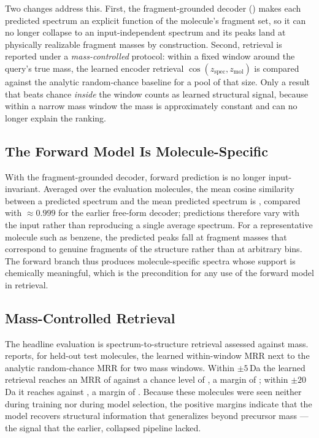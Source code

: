 Two changes address this.
First, the fragment-grounded decoder () makes each predicted spectrum an explicit function of the molecule's fragment set, so it can no longer collapse to an input-independent spectrum and its peaks land at physically realizable fragment masses by construction.
Second, retrieval is reported under a \emph{mass-controlled} protocol: within a fixed window around the query's true mass, the learned encoder retrieval $\cos(z_{\mathrm{spec}}, z_{\mathrm{mol}})$ is compared against the analytic random-chance baseline for a pool of that size.
Only a result that beats chance \emph{inside} the window counts as learned structural signal, because within a narrow mass window the mass is approximately constant and can no longer explain the ranking.

\subsection{The Forward Model Is Molecule-Specific}
\label{sec:molecule-specific}

With the fragment-grounded decoder, forward prediction is no longer input-invariant.
Averaged over the evaluation molecules, the mean cosine similarity between a predicted spectrum and the mean predicted spectrum is , compared with $\approx 0.999$ for the earlier free-form decoder; predictions therefore vary with the input rather than reproducing a single average spectrum.
For a representative molecule such as benzene, the predicted peaks fall at fragment masses \ph{[m/z list]} that correspond to genuine fragments of the structure rather than at arbitrary bins.
The forward branch thus produces molecule-specific spectra whose support is chemically meaningful, which is the precondition for any use of the forward model in retrieval.

\subsection{Mass-Controlled Retrieval}

The headline evaluation is spectrum-to-structure retrieval assessed against mass.
 reports, for held-out test molecules, the learned within-window MRR next to the analytic random-chance MRR for two mass windows.
Within $\pm 5$\,Da the learned retrieval reaches an MRR of  against a chance level of , a margin of ; within $\pm 20$\,Da it reaches  against , a margin of .
Because these molecules were seen neither during training nor during model selection, the positive margins indicate that the model recovers structural information that generalizes beyond precursor mass --- the signal that the earlier, collapsed pipeline lacked.

